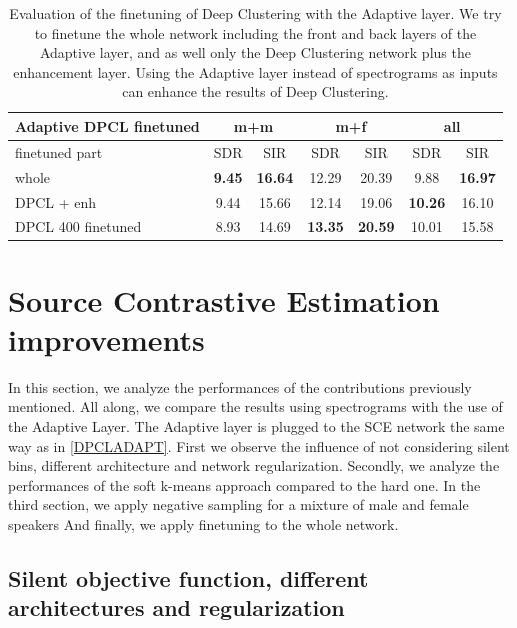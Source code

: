 \documentclass[master, tikz, final,11pt, dvipdfmx]{iscs-thesis}
\begin{document}
\begin{table}[h]
\centering
\begin{tabular}{l|c|c|c|c|c|c}
Adaptive DPCL finetuned & \multicolumn{2}{c|}{m+m} & \multicolumn{2}{c|}{m+f} & \multicolumn{2}{c}{all} \\ 
\hline 
finetuned part & SDR & SIR & SDR & SIR & SDR & SIR \\ 
\hline 
whole & \textbf{9.45} & \textbf{16.64} & 12.29 & 20.39 & 9.88 & \textbf{16.97} \\  
DPCL + enh & 9.44 & 15.66 & 12.14 & 19.06 & \textbf{10.26} & 16.10 \\ 
\hline
\hline 
DPCL 400 finetuned & 8.93 & 14.69 & \textbf{13.35} &\textbf{ 20.59} & 10.01 & 15.58 \\ 
\end{tabular}
\caption[Evaluation of the finetuning of Deep Clustering with the Adaptive layer]{Evaluation of the finetuning of Deep Clustering with the Adaptive layer. We try to finetune the whole network including the front and back layers of the Adaptive layer, and as well only the Deep Clustering network plus the enhancement layer. Using the Adaptive layer instead of spectrograms as inputs can enhance the results of Deep Clustering.}
\label{table:AdaptDPCLfine}
\end{table}

\section{Source Contrastive Estimation improvements}

In this section, we analyze the performances of the contributions previously mentioned. All along, we compare the results using spectrograms with the use of the Adaptive Layer. The Adaptive layer is plugged to the SCE network the same way as in \autoref{DPCLADAPT}.
First we observe the influence of not considering silent bins, different architecture and network regularization. Secondly, we analyze the performances of the soft k-means approach compared to the hard one. In the third section, we apply negative sampling for a mixture of male and female speakers
And finally, we apply finetuning to the whole network.

\subsection{Silent objective function, different architectures and regularization}
\label{silentloss}
\end{document}
